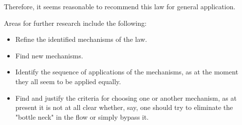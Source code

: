 \documentclass[a4paper,11pt]{article}
\begin{document}
Therefore, it seems reasonable to recommend this law for general application.

Areas for further research include the following:
\begin{itemize}
\item Refine the identified mechanisms of the law.
\item Find new mechanisms.
\item Identify the sequence of applications of the mechanisms, as at the
  moment they all seem to be applied equally.
\item Find and justify the criteria for choosing one or another mechanism, as
  at present it is not at all clear whether, say, one should try to eliminate
  the "bottle neck" in the flow or simply bypass it.
\end{itemize}
\end{document}
